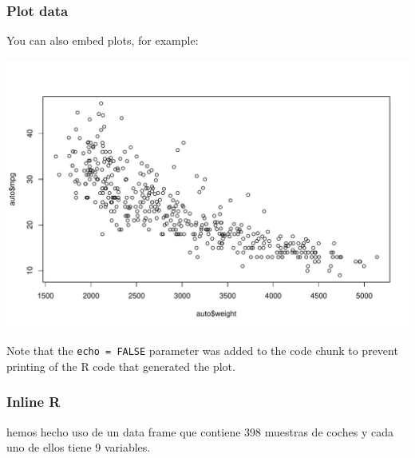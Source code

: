 \documentclass[]{article}
\begin{document}
\subsubsection{Plot data}\label{plot-data}

You can also embed plots, for example:

\includegraphics{intro_markdown_files/figure-latex/disperssion-1.pdf}

Note that the \texttt{echo\ =\ FALSE} parameter was added to the code
chunk to prevent printing of the R code that generated the plot.

\subsubsection{Inline R}\label{inline-r}

hemos hecho uso de un data frame que contiene 398 muestras de coches y
cada uno de ellos tiene 9 variables.
\end{document}
